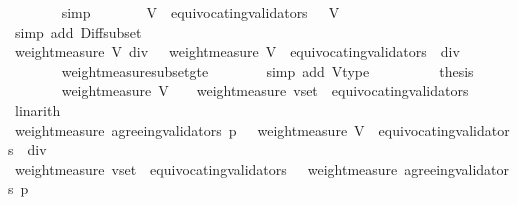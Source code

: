 \begin{isabellebody}
\ \ \ \ \ \ \isamarkupfalse%
\ simp\isanewline
\ \ \ \ \isamarkupfalse%
\ \isamarkupfalse%
\ {\isachardoublequoteopen}V\ {\isacharminus}\ equivocating{\isacharunderscore}validators\ {\isasymsigma}\ {\isasymsubseteq}\ V{\isachardoublequoteclose}\isanewline
\ \ \ \ \ \ \isamarkupfalse%
\ {\isacharparenleft}simp\ add{\isacharcolon}\ Diff{\isacharunderscore}subset{\isacharparenright}\isanewline
\ \ \ \ \isamarkupfalse%
\ \isamarkupfalse%
\ {\isachardoublequoteopen}{\isacharparenleft}weight{\isacharunderscore}measure\ V{\isacharparenright}\ div\ {}\ {\isasymge}\ {\isacharparenleft}weight{\isacharunderscore}measure\ {\isacharparenleft}V\ {\isacharminus}\ equivocating{\isacharunderscore}validators\ {\isasymsigma}{\isacharparenright}{\isacharparenright}\ div\ {}{\isachardoublequoteclose}\ \isanewline
\ \ \ \ \ \ \isamarkupfalse%
\ weight{\isacharunderscore}measure{\isacharunderscore}subset{\isacharunderscore}gte\isanewline
\ \ \ \ \ \ \isamarkupfalse%
\ {\isacharparenleft}simp\ add{\isacharcolon}\ V{\isacharunderscore}type{\isacharparenright}\ \ \isanewline
\ \ \ \ \isamarkupfalse%
\ \isamarkupfalse%
\ {\isacharquery}thesis\isanewline
\ \ \ \ \ \ \isamarkupfalse%
\ {\isacartoucheopen}weight{\isacharunderscore}measure\ V\ {\isacharslash}\ {}\ {\isacharless}\ weight{\isacharunderscore}measure\ {\isacharparenleft}v{\isacharunderscore}set\ {\isacharminus}\ equivocating{\isacharunderscore}validators\ {\isasymsigma}{\isacharparenright}{\isacartoucheclose}\ \isamarkupfalse%
\ linarith\isanewline
\ \ \isamarkupfalse%
\isanewline
\ \ \isamarkupfalse%
\ \isamarkupfalse%
\ {\isachardoublequoteopen}weight{\isacharunderscore}measure\ {\isacharparenleft}agreeing{\isacharunderscore}validators\ {\isacharparenleft}p{\isacharcomma}\ {\isasymsigma}{\isacharparenright}{\isacharparenright}\ {\isachargreater}\ weight{\isacharunderscore}measure\ {\isacharparenleft}V\ {\isacharminus}\ equivocating{\isacharunderscore}validators\ {\isasymsigma}{\isacharparenright}\ div\ {}{\isachardoublequoteclose}\ \isanewline
\ \ \ \ \isamarkupfalse%
\ {\isacartoucheopen}weight{\isacharunderscore}measure\ {\isacharparenleft}v{\isacharunderscore}set\ {\isacharminus}\ equivocating{\isacharunderscore}validators\ {\isasymsigma}{\isacharparenright}\ {\isasymle}\ weight{\isacharunderscore}measure\ {\isacharparenleft}agreeing{\isacharunderscore}validators\ {\isacharparenleft}p{\isacharcomma}\ {\isasymsigma}{\isacharparenright}{\isacharparenright}{\isacartoucheclose}\isanewline

\end{isabellebody}
